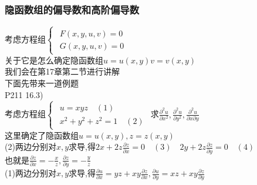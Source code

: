 \documentclass[xetex]{beamer}
\begin{document}
\begin{frame}
	\frametitle{隐函数组的偏导数和高阶偏导数}
	考虑方程组$\begin{cases} 
		\begin{matrix}
			F(x,y,u,v)=0\\
			G(x,y,u,v)=0
		\end{matrix}
	\end{cases}
	$\\关于它是怎么确定隐函数组$u=u(x,y)$\quad$v=v(x,y)$\\
	我们会在第17章第二节进行讲解\\
	下面先带来一道例题\\
	P211 16.3)\\
	考虑方程组$\begin{cases} 
	\begin{matrix}
	u=xyz\quad(1)\\
	x^2+y^2+z^2=1\quad(2)
	\end{matrix}
	\end{cases}$\quad 求$\frac{\partial^2 u}{\partial x^2},\frac{\partial^2 u}{\partial y^2},\frac{\partial^2 u}{\partial x\partial y}$\\
	这里确定了隐函数组$u=u(x,y),z=z(x,y)$\\
	(2)两边分别对$x,y$求导,得$2x+2z\frac{\partial z}{\partial x}=0\quad(3)\quad 2y+2z\frac{\partial z}{\partial y}=0\quad(4)$\\ \pause
	也就是$\frac{\partial z}{\partial x}=-\frac{x}{z},\frac{\partial z}{\partial y}=-\frac{y}{z}$\\ \pause
	(1)两边分别对$x,y$求导,得$\frac{\partial u}{\partial x}=yz+xy\frac{\partial z}{\partial x},\frac{\partial u}{\partial y}=xz+xy\frac{\partial z}{\partial y}$\\ 
	
\end{frame}
\end{document}

